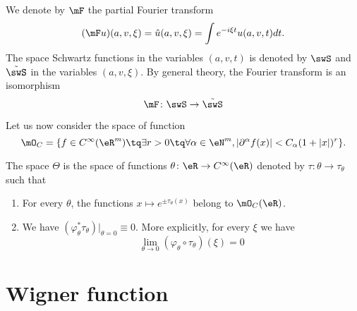We denote by $\mF$ the partial Fourier transform
\begin{equation}
	(\mF u)(a,v,\xi)=\hat u(a,v,\xi)=\int e^{-i\xi t}u(a,v,t)dt.
\end{equation}
The space Schwartz functions in the variables $(a,v,t)$ is denoted by $\swS$ and $\tilde\swS$ in the variables $(a,v,\xi)$. By general theory, the Fourier transform is an isomorphism
\begin{equation}
	\mF\colon \swS\to \tilde\swS
\end{equation}

Let us now consider the space of function
\begin{equation}
	\mO_C=\{ f\in C^{\infty}(\eR^m)\tq \exists r>0\tq\forall\alpha\in\eN^m,| \partial^{\alpha}f(x) |<C_{\alpha}(1+| x |)^r \}.
\end{equation}

\begin{definition}
	The space $\Theta$ is the space of functions $\theta\colon \eR\to  C^{\infty}(\eR)$ denoted by $\tau\colon \theta\to \tau_{\theta}$ such that
	\begin{enumerate}
		\item
		      For every $\theta$, the functions $x\mapsto e^{\pm\tau_{\theta}(x)}$ belong to $\mO_C(\eR)$.
		\item
		      We have $(\varphi_{\theta}^*\tau_{\theta})|_{\theta=0}\equiv 0$. More explicitly, for every $\xi$ we have
		      \begin{equation}
			      \lim_{\theta\to 0} (\varphi_{\theta}\circ\tau_{\theta})(\xi)=0
		      \end{equation}
	\end{enumerate}
\end{definition}

\section{Wigner function}

